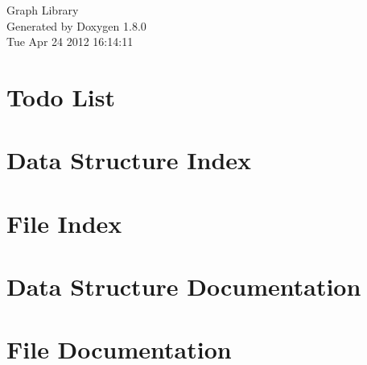 \documentclass{book}
\begin{document}
\hypersetup{pageanchor=false,citecolor=blue}
\begin{titlepage}
\vspace*{7cm}
\begin{center}
{\Large Graph Library }\\
\vspace*{1cm}
{\large Generated by Doxygen 1.8.0}\\
\vspace*{0.5cm}
{\small Tue Apr 24 2012 16:14:11}\\
\end{center}
\end{titlepage}
\clearemptydoublepage
{}
\tableofcontents
\clearemptydoublepage
{}
\hypersetup{pageanchor=true,citecolor=blue}
\chapter{Todo List}
\label{todo}
\hypertarget{todo}{}

\chapter{Data Structure Index}

\chapter{File Index}

\chapter{Data Structure Documentation}







\chapter{File Documentation}





















\printindex
\end{document}
